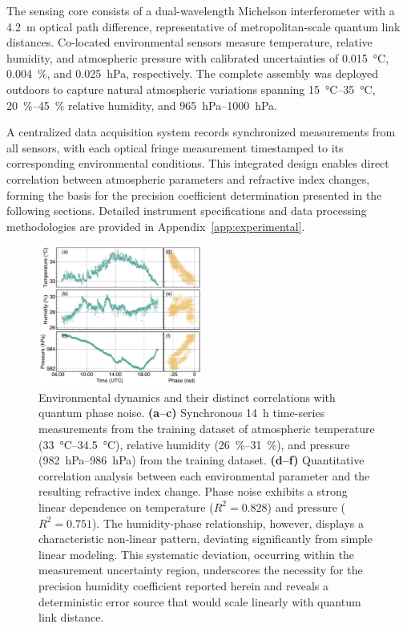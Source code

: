 \documentclass[aps,pra,reprint,groupedaddress,twocolumn,superscriptaddress]{revtex4-2}
\begin{document}
The sensing core consists of a dual-wavelength Michelson interferometer with a \SI{4.2}{\meter} optical path difference, representative of metropolitan-scale quantum link distances. Co-located environmental sensors measure temperature, relative humidity, and atmospheric pressure with calibrated uncertainties of \SI{0.015}{\celsius}, \SI{0.004}{\percent}, and \SI{0.025}{\hecto\pascal}, respectively. The complete assembly was deployed outdoors to capture natural atmospheric variations spanning \SIrange{15}{35}{\celsius}, \SIrange{20}{45}{\percent} relative humidity, and \SIrange{965}{1000}{\hecto\pascal}.

A centralized data acquisition system records synchronized measurements from all sensors, with each optical fringe measurement timestamped to its corresponding environmental conditions. This integrated design enables direct correlation between atmospheric parameters and refractive index changes, forming the basis for the precision coefficient determination presented in the following sections. Detailed instrument specifications and data processing methodologies are provided in Appendix~\ref{app:experimental}.

\begin{figure}
\centering
\includegraphics[width=0.48\textwidth]{figures/fig2_new.pdf}
\caption{
Environmental dynamics and their distinct correlations with quantum phase noise.
\textbf{(a--c)} Synchronous \SI{14}{\hour} time-series measurements from the training dataset of atmospheric temperature (\SIrange{33}{34.5}{\celsius}), relative humidity (\SIrange{26}{31}{\percent}), and pressure (\SIrange{982}{986}{\hecto\pascal}) from the training dataset.
\textbf{(d--f)} Quantitative correlation analysis between each environmental parameter and the resulting refractive index change. Phase noise exhibits a strong linear dependence on temperature ($R^{2} = 0.828$) and pressure ($R^{2} = 0.751$). The humidity-phase relationship, however, displays a characteristic non-linear pattern, deviating significantly from simple linear modeling. This systematic deviation, occurring within the measurement uncertainty region, underscores the necessity for the precision humidity coefficient reported herein and reveals a deterministic error source that would scale linearly with quantum link distance.
}
\label{fig:environmental_dynamics}
\end{figure}
\end{document}
